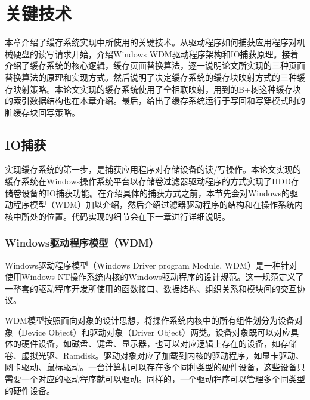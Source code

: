 
\chapter{关键技术}
\label{cha:key_tech}

本章介绍了缓存系统实现中所使用的关键技术。从驱动程序如何捕获应用程序对机械硬盘的读写请求开始，介绍Windows WDM驱动程序架构和IO捕获原理。接着介绍了缓存系统的核心逻辑，缓存页面替换算法，逐一说明论文所实现的三种页面替换算法的原理和实现方式。然后说明了决定缓存系统的缓存块映射方式的三种缓存映射策略。本论文实现的缓存系统使用了全相联映射，用到的B+树这种缓存块的索引数据结构也在本章介绍。最后，给出了缓存系统运行于写回和写穿模式时的脏缓存块回写策略。

\section{IO捕获}
\label{sec:capture_io}

实现缓存系统的第一步，是捕获应用程序对存储设备的读/写操作。本论文实现的缓存系统在Windows操作系统平台以存储卷过滤器驱动程序的方式实现了HDD存储卷设备的IO捕获功能。在介绍具体的捕获方式之前，本节先会对Windows的驱动程序模型（WDM）加以介绍，然后介绍过滤器驱动程序的结构和在操作系统内核中所处的位置。代码实现的细节会在下一章进行详细说明。

\subsection{Windows驱动程序模型（WDM）}
Windows驱动程序模型（Windows Driver program Module, WDM）是一种针对使用Windows NT操作系统内核的Windows驱动程序的设计规范\cite{wdm2001}。这一规范定义了一整套的驱动程序开发所使用的函数接口、数据结构、组织关系和模块间的交互协议。

WDM模型按照面向对象的设计思想，将操作系统内核中的所有组件划分为设备对象（Device Object）和驱动对象（Driver Object）两类。设备对象既可以对应具体的硬件设备，如磁盘、键盘、显示器，也可以对应逻辑上存在的设备，如存储卷、虚拟光驱、Ramdisk。驱动对象对应了加载到内核的驱动程序，如显卡驱动、网卡驱动、鼠标驱动。一台计算机可以存在多个同种类型的硬件设备，这些设备只需要一个对应的驱动程序就可以驱动。同样的，一个驱动程序可以管理多个同类型的硬件设备。

